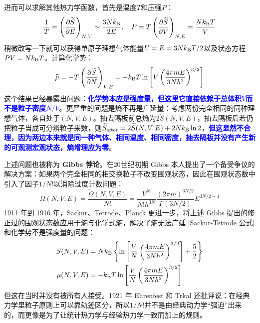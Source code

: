 进而可以求解其他热力学函数，首先是温度$T$和压强$P$：
\[\frac{1}{T}=\left(\pdv{\widetilde{S}}{E}\right)_{N,V}\sim\frac{3Nk_{\rm B}}{2E}, \quad P=T\left(\pdv{\widetilde{S}}{V}\right)_{N,E}=\frac{Nk_{\rm B} T}{V}\]
稍微改写一下就可以获得单原子理想气体能量$U=E=3Nk_{\rm B} T/2$以及状态方程$PV=Nk_{\rm B}T$。计算化学势：
\[\widetilde{\mu}=-T\left(\pdv{\widetilde{S}}{N}\right)_{V,E}=-k_{\rm B} T\ln\left[V\left(\frac{4\pi mE}{3Nh^2}\right)^{3/2}\right]\]
这个结果已经暴露出问题：\textcolor{blue}{\textbf{化学势本应是强度量，但这里它直接依赖于总体积$V$而不是粒子密度$N/V$}}。更严重的问题是熵不再是广延量：考虑两份完全相同的同种理想气体，各自处于$(N,V,E)$。抽去隔板前总熵为$2\widetilde{S}(N,V,E)$，抽去隔板后若仍把粒子当成可分辨粒子来数，则$\widetilde{S}_{\rm after}=2\widetilde{S}(N,V,E)+2Nk_{\rm B}\ln 2$，\textcolor{blue}{\textbf{但这显然不合理，因为两边本来就是同一种气体、相同温度、相同密度，抽去隔板并没有产生新的可观测宏观状态，熵增理应为零}}。

上述问题也被称为\textbf{ Gibbs 悖论}。在20世纪初期 Gibbs 本人提出了一个备受争议的解决方案：如果两个完全相同的相交换粒子不改变围观状态，因此在围观状态数中引入了因子$1/N!$以消除过度计数问题：
\begin{equation}\label{eq:partition_nve_mono}
\Omega(N,V,E)=\frac{\widetilde{\Omega}(N,V,E)}{N!}=\frac{V^N}{N!h^{3N}}\frac{(2\pi m)^{3N/2}}{\Gamma(3N/2)}E^{3N/2-1}
\end{equation}
1911 年到 1916 年，Sackur、Tetrode、Planck 更进一步，将上述 Gibbs 提出的修正过的围观状态数应用于熵与化学式熵，解决了熵无法广延 [Sackur-Tetrode 公式] 和化学势不是强度量的问题：
\[\begin{aligned}
S(N,V,E) &=Nk_{\rm B}\left\{\ln\left[\frac{V}{N}\left(\frac{4\pi mE}{3Nh^2}\right)^{3/2}\right]+\frac{5}{2}\right\}\\
\mu(N,V,E)&=-k_{\rm B} T\ln\left[\frac{V}{N}\left(\frac{4\pi mE}{3Nh^2}\right)^{3/2}\right]
\end{aligned}\]
但这在当时并没有被所有人接受。1921 年 Ehrenfest 和 Trkal 还批评说：在经典力学里粒子原则上可以靠轨迹区分，所以$1/N!$并不是由经典动力学“强迫”出来的，而更像是为了让统计热力学与经验热力学一致而加上的规则。

